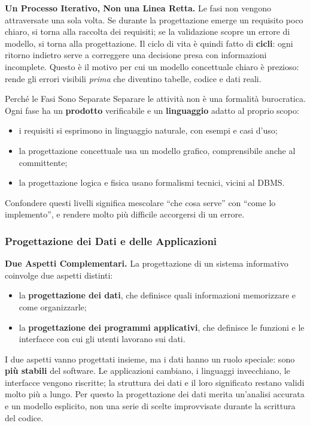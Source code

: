 \documentclass[12pt]{extarticle}
\begin{document}
\medskip
\noindent \textbf{Un Processo Iterativo, Non una Linea Retta.} Le fasi non vengono attraversate una sola volta. Se durante la progettazione emerge un requisito poco chiaro, si torna alla raccolta dei requisiti; se la validazione scopre un errore di modello, si torna alla progettazione. Il ciclo di vita è quindi fatto di \textbf{cicli}: ogni ritorno indietro serve a correggere una decisione presa con informazioni incomplete. Questo è il motivo per cui un modello concettuale chiaro è prezioso: rende gli errori visibili \textit{prima} che diventino tabelle, codice e dati reali.

\begin{cbox}{Perché le Fasi Sono Separate}
\noindent Separare le attività non è una formalità burocratica. Ogni fase ha un \textbf{prodotto} verificabile e un \textbf{linguaggio} adatto al proprio scopo:
\begin{itemize}
    \item i requisiti si esprimono in linguaggio naturale, con esempi e casi d'uso;
    \item la progettazione concettuale usa un modello grafico, comprensibile anche al committente;
    \item la progettazione logica e fisica usano formalismi tecnici, vicini al DBMS.
\end{itemize}
Confondere questi livelli significa mescolare ``che cosa serve'' con ``come lo implemento'', e rendere molto più difficile accorgersi di un errore.
\end{cbox}

\subsubsection{Progettazione dei Dati e delle Applicazioni}

\noindent \textbf{Due Aspetti Complementari.} La progettazione di un sistema informativo coinvolge due aspetti distinti:
\begin{itemize}
    \item la \textbf{progettazione dei dati}, che definisce quali informazioni memorizzare e come organizzarle;
    \item la \textbf{progettazione dei programmi applicativi}, che definisce le funzioni e le interfacce con cui gli utenti lavorano sui dati.
\end{itemize}
I due aspetti vanno progettati insieme, ma i dati hanno un ruolo speciale: sono \textbf{più stabili} del software. Le applicazioni cambiano, i linguaggi invecchiano, le interfacce vengono riscritte; la struttura dei dati e il loro significato restano validi molto più a lungo. Per questo la progettazione dei dati merita un'analisi accurata e un modello esplicito, non una serie di scelte improvvisate durante la scrittura del codice.
\end{document}
